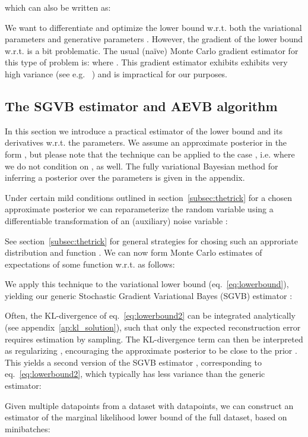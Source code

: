 \documentclass{article} \usepackage{nips13submit_e,times}
\theoremstyle{definition}
\theoremstyle{definition}
\begin{document}
which can also be written as:

We want to differentiate and optimize the lower bound  w.r.t. both the variational parameters  and generative parameters . However, the gradient of the lower bound w.r.t.  is a bit problematic. The usual (na\"ive) Monte Carlo gradient estimator for this type of problem is:
 where . This gradient estimator exhibits exhibits very high variance (see e.g. ~\cite{blei2012variational}) and is impractical for our purposes.





\subsection{The SGVB estimator and AEVB algorithm}
\label{subsec:our_estimator}

In this section we introduce a practical estimator of the lower bound and its derivatives w.r.t. the parameters. We assume an approximate posterior in the form , but please note that the technique can be applied to the case , i.e. where we do not condition on , as well. The fully variational Bayesian method for inferring a posterior over the parameters is given in the appendix.

Under certain mild conditions outlined in section~\ref{subsec:thetrick} for a chosen approximate posterior  we can reparameterize the random variable  using a differentiable transformation  of an (auxiliary) noise variable :

See section~\ref{subsec:thetrick} for general strategies for chosing such an approriate distribution  and function . 
We can now form Monte Carlo estimates of expectations of some function  w.r.t.  as follows:

We apply this technique to the variational lower bound (eq.~\eqref{eq:lowerbound}), yielding our generic Stochastic Gradient Variational Bayes (SGVB) estimator :

Often, the KL-divergence  of eq.~\eqref{eq:lowerbound2} can be integrated analytically (see appendix~\ref{ap:kl_solution}), such that only the expected reconstruction error  requires estimation by sampling. The KL-divergence term can then be interpreted as regularizing , encouraging the approximate posterior to be close to the prior .
This yields a second version of the SGVB estimator , corresponding to eq.~\eqref{eq:lowerbound2}, which typically has less variance than the generic estimator:

Given multiple datapoints from a dataset  with  datapoints, we can construct an estimator of the marginal likelihood lower bound of the full dataset, based on minibatches:
\end{document}
